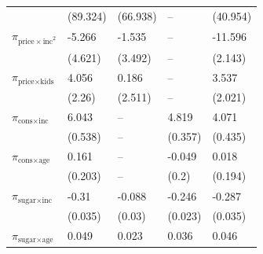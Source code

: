\begin{tabular}{lllll}
                                                         & (89.324)         & (66.938)                                          & --                        & (40.954)          \\
 $\pi_{\text{price} \times \text{inc}^2}$                & -5.266           & -1.535                                            & --                        & -11.596           \\
                                                         & (4.621)          & (3.492)                                           & --                        & (2.143)           \\
 $\pi_{\text{price} \times \text{kids}}$                 & 4.056            & 0.186                                             & --                        & 3.537             \\
                                                         & (2.26)           & (2.511)                                           & --                        & (2.021)           \\
 $\pi_{\text{cons} \times \text{inc}}$                   & 6.043            & --                                                & 4.819                     & 4.071             \\
                                                         & (0.538)          & --                                                & (0.357)                   & (0.435)           \\
 $\pi_{\text{cons}  \times \text{age}}$                  & 0.161            & --                                                & -0.049                    & 0.018             \\
                                                         & (0.203)          & --                                                & (0.2)                     & (0.194)           \\
 $\pi_{\text{sugar} \times \text{inc}}$                  & -0.31            & -0.088                                            & -0.246                    & -0.287            \\
                                                         & (0.035)          & (0.03)                                            & (0.023)                   & (0.035)           \\
 $\pi_{\text{sugar} \times \text{age}}$                  & 0.049            & 0.023                                             & 0.036                     & 0.046             \\

\end{tabular}
